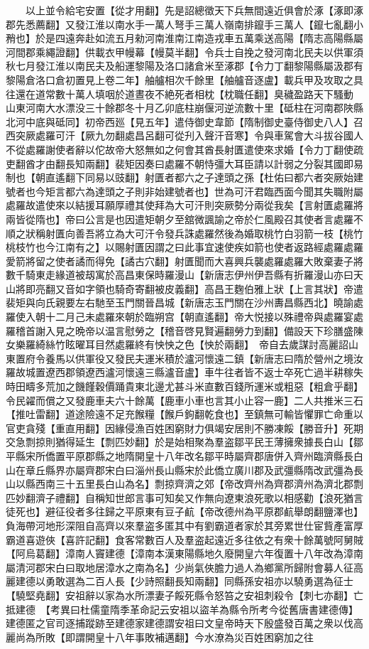 　　以上並令給宅安置【從才用翻】先是詔總徵天下兵無間遠近俱會於涿【涿即涿郡先悉薦翻】又發江淮以南水手一萬人弩手三萬人嶺南排鑹手三萬人【鑹七亂翻小矟也】於是四遠奔赴如流五月勑河南淮南江南造戎車五萬乘送高陽【隋志高陽縣屬河間郡乘繩證翻】供載衣甲幔幕【幔莫半翻】令兵士自挽之發河南北民夫以供軍須秋七月發江淮以南民夫及船運黎陽及洛口諸倉米至涿郡【令力丁翻黎陽縣屬汲郡有黎陽倉洛口倉初置見上卷二年】舳艫相次千餘里【舳艫音逐盧】載兵甲及攻取之具往還在道常數十萬人填咽於道晝夜不絶死者相枕【枕職任翻】臭穢盈路天下騷動　山東河南大水漂没三十餘郡冬十月乙卯底柱崩偃河逆流數十里【砥柱在河南郡陜縣北河中底與砥同】初帝西廵【見五年】遣侍御史韋節【隋制御史臺侍御史八人】召西突厥處羅可汗【厥九勿翻處昌呂翻可從刋入聲汗音寒】令與車駕會大斗拔谷國人不從處羅謝使者辭以佗故帝大怒無如之何會其酋長射匱遣使來求婚【令力丁翻使疏吏翻酋才由翻長知兩翻】裴矩因奏曰處羅不朝恃彊大耳臣請以計弱之分裂其國即易制也【朝直遙翻下同易以豉翻】射匱者都六之子達頭之孫【杜佑曰都六者突厥始建號者也今矩言都六為達頭之子則非始建號者也】世為可汗君臨西面今聞其失職附屬處羅故遣使來以結援耳願厚禮其使拜為大可汗則突厥勢分兩從我矣【言射匱處羅將兩皆從隋也】帝曰公言是也因遣矩朝夕至舘微諷諭之帝於仁風殿召其使者言處羅不順之狀稱射匱向善吾將立為大可汗令發兵誅處羅然後為婚取桃竹白羽箭一枝【桃竹桃枝竹也今江南有之】以賜射匱因謂之曰此事宜速使疾如箭也使者返路經處羅處羅愛箭將留之使者譎而得免【譎古穴翻】射匱聞而大喜興兵襲處羅處羅大敗棄妻子將數千騎東走緣道被刼寓於高昌東保時羅漫山【新唐志伊州伊吾縣有折羅漫山亦曰天山將即亮翻又音如字領也騎奇寄翻被皮義翻】高昌王麴伯雅上狀【上言其狀】帝遣裴矩與向氏親要左右馳至玉門關晉昌城【新唐志玉門關在沙州夀昌縣西北】曉諭處羅使入朝十二月己未處羅來朝於臨朔宫【朝直遙翻】帝大悦接以殊禮帝與處羅宴處羅稽首謝入見之晩帝以温言慰勞之【稽音啓見賢遍翻勞力到翻】備設天下珍膳盛陳女樂羅綺絲竹眩曜耳目然處羅終有怏怏之色【怏於兩翻】　帝自去歲謀討高麗詔山東置府令養馬以供軍役又發民夫運米積於瀘河懷遠二鎮【新唐志曰隋於營州之境汝羅故城置遼西郡領遼西瀘河懷遠三縣瀘音盧】車牛往者皆不返士卒死亡過半耕稼失時田疇多荒加之饑饉穀價踊貴東北邊尤甚斗米直數百錢所運米或粗惡【粗倉乎翻】令民糴而償之又發鹿車夫六十餘萬【鹿車小車也言其小止容一鹿】二人共推米三石【推吐雷翻】道途險遠不足充餱糧【餱戶鉤翻乾食也】至鎮無可輸皆懼罪亡命重以官吏貪殘【重直用翻】因緣侵漁百姓困窮財力俱竭安居則不勝凍餒【勝音升】死期交急剽掠則猶得延生【剽匹妙翻】於是始相聚為羣盗鄒平民王薄擁衆據長白山【鄒平縣宋所僑置平原郡縣之地隋開皇十八年改名鄒平時屬齊郡唐併入齊州臨濟縣長白山在章丘縣界亦屬齊郡宋白曰淄州長山縣宋於此僑立廣川郡及武彊縣隋改武彊為長山以縣西南三十五里長白山為名】剽掠齊濟之郊【帝改齊州為齊郡濟州為濟北郡剽匹妙翻濟子禮翻】自稱知世郎言事可知矣又作無向遼東浪死歌以相感勸【浪死猶言徒死也】避征役者多往歸之平原東有豆子䴚【帝改德州為平原郡䴚舉朗翻鹽澤也】負海帶河地形深阻自高齊以來羣盗多匿其中有劉霸道者家於其旁累世仕宦貲產富厚霸道喜遊俠【喜許記翻】食客常數百人及羣盗起遠近多往依之有衆十餘萬號阿舅賊【阿烏葛翻】漳南人竇建德【漳南本漢東陽縣地久廢開皇六年復置十八年改為漳南屬清河郡宋白曰取地居漳水之南為名】少尚氣俠膽力過人為鄉黨所歸附會募人征高麗建德以勇敢選為二百人長【少詩照翻長知兩翻】同縣孫安祖亦以驍勇選為征士【驍堅堯翻】安祖辭以家為水所漂妻子餒死縣令怒笞之安祖刺殺令【刺七亦翻】亡抵建德　【考異曰杜儒童隋季革命記云安祖以盜羊為縣令所考今從舊唐書建德傳】建德匿之官司逐捕蹤跡至建德家建德謂安祖曰文皇帝時天下殷盛發百萬之衆以伐高麗尚為所敗【即謂開皇十八年事敗補邁翻】今水潦為災百姓困窮加之往